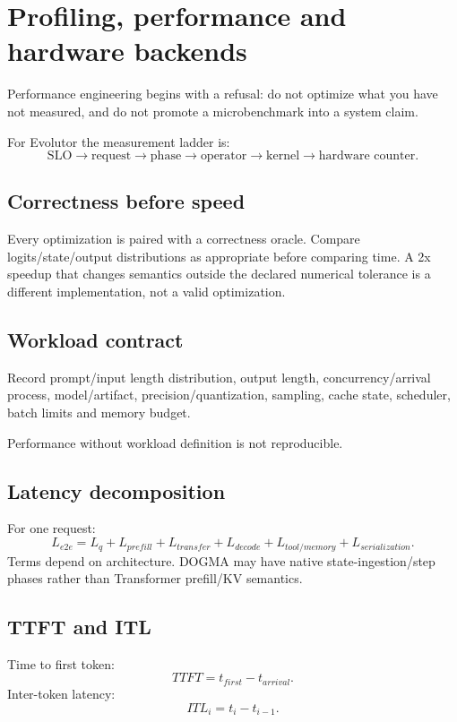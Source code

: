 \chapter{Profiling, performance and hardware backends}

Performance engineering begins with a refusal: do not optimize what you have not measured, and do not promote a microbenchmark into a system claim.

For Evolutor the measurement ladder is:
\[
\text{SLO}\rightarrow\text{request}\rightarrow\text{phase}\rightarrow
\text{operator}\rightarrow\text{kernel}\rightarrow\text{hardware counter}.
\]

\section{Correctness before speed}
Every optimization is paired with a correctness oracle. Compare logits/state/output distributions as appropriate before comparing time. A 2x speedup that changes semantics outside the declared numerical tolerance is a different implementation, not a valid optimization.

\section{Workload contract}
Record prompt/input length distribution, output length, concurrency/arrival process, model/artifact, precision/quantization, sampling, cache state, scheduler, batch limits and memory budget.

Performance without workload definition is not reproducible.

\section{Latency decomposition}
For one request:
\[
L_{e2e}=L_q+L_{prefill}+L_{transfer}+L_{decode}+L_{tool/memory}+L_{serialization}.
\]
Terms depend on architecture. DOGMA may have native state-ingestion/step phases rather than Transformer prefill/KV semantics.

\section{TTFT and ITL}
Time to first token:
\[
TTFT=t_{first}-t_{arrival}.
\]
Inter-token latency:
\[
ITL_i=t_i-t_{i-1}.
\]

